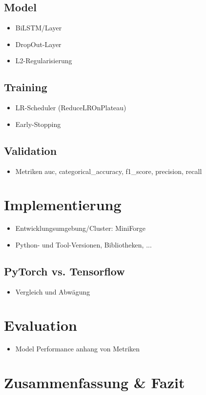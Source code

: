 \documentclass{article}
\begin{document}
    \subsection{Model}
    \begin{itemize}
        \item BiLSTM/Layer
        \item DropOut-Layer
        \item L2-Regularisierung
    \end{itemize}
    \subsection{Training}
    \begin{itemize}
        \item LR-Scheduler (ReduceLROnPlateau)
        \item Early-Stopping
    \end{itemize}
    \subsection{Validation}
    \begin{itemize}
        \item Metriken auc, categorical\_accuracy, f1\_score, precision, recall
    \end{itemize}
    \section{Implementierung}
    \begin{itemize}
        \item Entwicklungsumgebung/Cluster: MiniForge
        \item Python- und Tool-Versionen, Bibliotheken, ...
    \end{itemize}
    \subsection{PyTorch vs. Tensorflow}
    \begin{itemize}
        \item Vergleich und Abwägung
    \end{itemize}
    \section{Evaluation}
    \begin{itemize}
        \item Model Performance anhang von Metriken
    \end{itemize}

    \section{Zusammenfassung \& Fazit}

    
    
\end{document}
